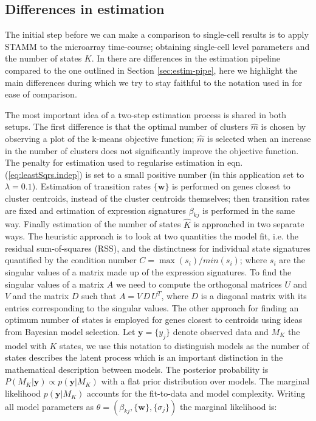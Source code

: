 \subsection{Differences in estimation}
\label{sec:diff-estim}

The initial step before we can make a comparison to single-cell results is to apply STAMM to the microarray time-course; obtaining single-cell level parameters and the number of states $K$. In  \cite{Armond:2013} there are differences in the estimation pipeline compared to the one outlined in Section \ref{sec:estim-pipe}, here we highlight the main differences during which we try to stay faithful to the notation used in \cite{Armond:2013} for ease of comparison.

The most important idea of a two-step estimation process is shared in both setups. The first difference is that the optimal number of clusters $\hat{m}$ is chosen by observing a plot of the k-means objective function; $\hat{m}$ is selected when an increase in the number of clusters does not significantly improve the objective function. The penalty for estimation used to regularise estimation in eqn. (\ref{eq:leastSqrs.indep}) is set to a small positive number (in this application set to $ \lambda = 0.1 $). Estimation of transition rates $\lbrace \mathbf{w} \rbrace $ is performed on genes closest to cluster centroids, instead of the cluster centroids themselves; then transition rates are fixed and estimation of expression signatures $\beta_{kj}$ is performed in the same way. Finally estimation of the number of states $\hat{K}$ is approached in two separate ways. The heuristic approach is to look at two quantities the model fit, i.e. the residual sum-of-squares (RSS), and the distinctness for individual state signatures quantified by the condition number $C = \max(s_i) / min(s_i)$; where $s_i$ are the singular values of a matrix made up of the expression signatures. To find the singular values of a matrix $A$ we need to compute the orthogonal matrices $U$ and $V$ and the matrix $D$ such that $A = V\, D \, U^T$, where $D$ is a diagonal matrix with its entries corresponding to the singular values. The other approach for finding an optimum number of states is employed for genes closest to centroids using ideas from Bayesian model selection. Let $\mathbf{y} = \lbrace y_j \rbrace$ denote observed data and $M_K$ the model with $K$ states, we use this notation to distinguish models as the number of states describes the latent process which is an important distinction in the mathematical description between models. The posterior probability is $P(M_K | \mathbf{y}) \propto p(\mathbf{y}|M_K) $ with a flat prior distribution over models. The marginal likelihood $p(\mathbf{y} | M_K)$ accounts for the fit-to-data and model complexity. Writing all model parameters as $\theta = (\beta_{kj}, \lbrace \mathbf{w} \rbrace, \lbrace \sigma_j \rbrace) $ the marginal likelihood is:


